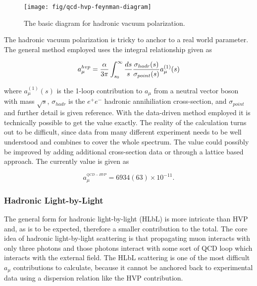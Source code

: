 \begin{figure}
\label{fig:qcd-hvp-feynman-diagram}
\centering
\texttt{[image: fig/qcd-hvp-feynman-diagram]}
\caption{The basic diagram for hadronic vacuum polarization.}
\end{figure}

The hadronic vacuum polarization is tricky to anchor to a real world parameter.  The general method employed uses the integral relationship given as

\begin{equation}
\label{eqn:qcd-hvp-integral}
a_\mu^{hvp} = \frac{\alpha}{3\pi} \int_{s_0}^{\infty} \frac{ds}{s} \\
\frac{\sigma_{hadr}(s)}{\sigma_{point}(s)} a_\mu^{(1)}(s)
\end{equation}

\noindent
where $a_\mu^{(1)}(s)$ is the 1-loop contribution to $a_\mu$ from a neutral vector boson with mass $\sqrt{s}$, $\sigma_{hadr}$ is the $e^+e^-$ hadronic annihiliation cross-section, and $\sigma_{point}$ and further detail is given reference\cite{amm-of-muon}.  With the data-driven method employed it is technically possible to get the value exactly.  The reality of the calculation turns out to be difficult, since data from many different experiment needs to be well understood and combines to cover the whole spectrum.  The value could possibly be improved by adding additional cross-section data or through a lattice based approach.  The currently value is given as

\begin{equation}
\label{eqn:qcd-hvp-total}
a_\mu^{^{QCD-HVP}} = 6934(63) \times 10^{-11}.
\end{equation}

\subsubsection{Hadronic Light-by-Light}

The general form for hadronic light-by-light (HLbL) is more intricate than HVP and, as is to be expected, therefore a smaller contribution to the total.  The core idea of hadronic light-by-light scattering is that propagating muon interacts with only three photons and those photons interact with some sort of QCD loop which interacts with the external field.  The HLbL scattering is one of the most difficult $a_\mu$ contributions to calculate, because it cannot be anchored back to experimental data using a dispersion relation like the HVP contribution\cite{the-muon-g-2}.

